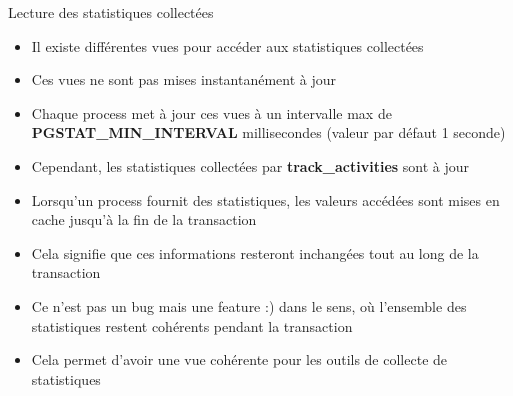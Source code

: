 \begin{frame}[fragile]{Lecture des statistiques collectées}

   \begin{itemize}
      \item Il existe différentes vues pour accéder aux statistiques collectées
      \item Ces vues ne sont pas mises instantanément à jour
      \item Chaque process met à jour ces vues à un intervalle max de \textbf{PGSTAT\_MIN\_INTERVAL} millisecondes (valeur par défaut 1 seconde)
      \item Cependant, les statistiques collectées par \textbf{track\_activities} sont à jour
      \item Lorsqu'un process fournit des statistiques, les valeurs accédées sont mises en cache jusqu'à la fin de la transaction
      \item Cela signifie que ces informations resteront inchangées tout au long de la transaction
      \item Ce n'est pas un bug mais une feature :) dans le sens, où l'ensemble des statistiques restent cohérents pendant la transaction
      \item Cela permet d'avoir une vue cohérente pour les outils de collecte de statistiques

   \end{itemize}

\end{frame}

%
%
%
%
%
%
%
%
%
%
%
%
